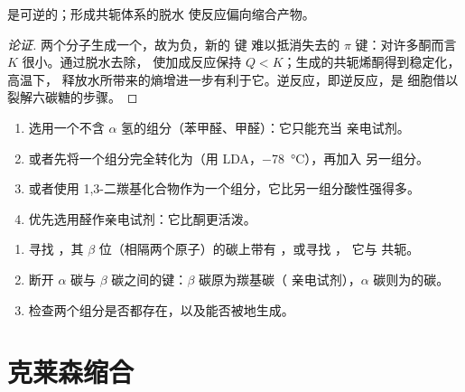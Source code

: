 \begin{proposition}[羟醛反应的驱动]\label{prop:b2:enolates-aldol:aldol-equilibrium}
是可逆的；形成共轭体系的脱水
使反应偏向缩合产物。
\end{proposition}

\begin{proof}[论证]
两个分子生成一个，故为负，新的  键
难以抵消失去的  $\pi$ 键：对许多酮而言 $K$ 很小。通过脱水去除，
使加成反应保持 $Q < K$；生成的共轭烯酮得到稳定化，高温下，
释放水所带来的熵增进一步有利于它。逆反应，即逆反应，是
细胞借以裂解六碳糖的步骤。
\end{proof}

\begin{method}[控制交叉羟醛反应]\label{met:b2:enolates-aldol:crossed-aldol}
\begin{enumerate}
  \item 选用一个不含 $\alpha$ 氢的组分（苯甲醛、甲醛）：它只能充当
        亲电试剂。
  \item 或者先将一个组分完全转化为（用 LDA，\qty{-78}{\degreeCelsius}），再加入
        另一组分。
  \item 或者使用 1,3-二羰基化合物作为一个组分，它比另一组分酸性强得多。
  \item 优先选用醛作亲电试剂：它比酮更活泼。
\end{enumerate}
\end{method}

\begin{method}[识别羟醛产物]\label{met:b2:enolates-aldol:aldol-recognition}
\begin{enumerate}
  \item 寻找 ，其 $\beta$ 位（相隔两个原子）的碳上带有 ，或寻找 ，
        它与  共轭。
  \item 断开 $\alpha$ 碳与 $\beta$ 碳之间的键：$\beta$ 碳原为羰基碳（
        亲电试剂），$\alpha$ 碳则为的碳。
  \item 检查两个组分是否都存在，以及能否被地生成。
\end{enumerate}
\end{method}

\section{克莱森缩合}

